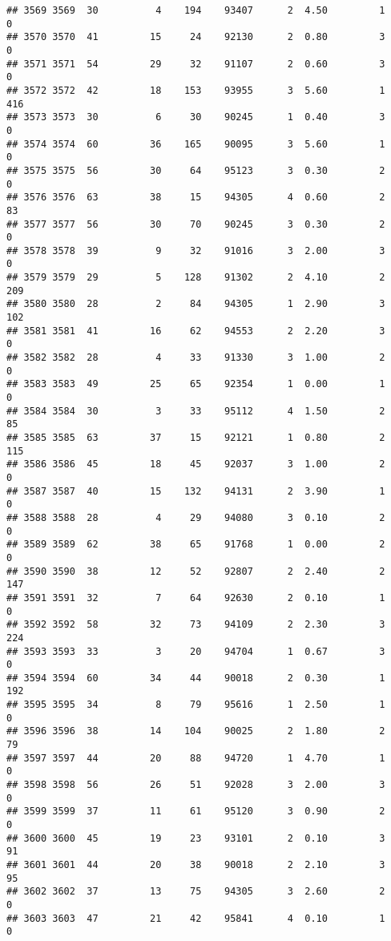 \documentclass[
]{article}
\begin{document}
\begin{verbatim}
## 3569 3569  30          4    194    93407      2  4.50         1        0
## 3570 3570  41         15     24    92130      2  0.80         3        0
## 3571 3571  54         29     32    91107      2  0.60         3        0
## 3572 3572  42         18    153    93955      3  5.60         1      416
## 3573 3573  30          6     30    90245      1  0.40         3        0
## 3574 3574  60         36    165    90095      3  5.60         1        0
## 3575 3575  56         30     64    95123      3  0.30         2        0
## 3576 3576  63         38     15    94305      4  0.60         2       83
## 3577 3577  56         30     70    90245      3  0.30         2        0
## 3578 3578  39          9     32    91016      3  2.00         3        0
## 3579 3579  29          5    128    91302      2  4.10         2      209
## 3580 3580  28          2     84    94305      1  2.90         3      102
## 3581 3581  41         16     62    94553      2  2.20         3        0
## 3582 3582  28          4     33    91330      3  1.00         2        0
## 3583 3583  49         25     65    92354      1  0.00         1        0
## 3584 3584  30          3     33    95112      4  1.50         2       85
## 3585 3585  63         37     15    92121      1  0.80         2      115
## 3586 3586  45         18     45    92037      3  1.00         2        0
## 3587 3587  40         15    132    94131      2  3.90         1        0
## 3588 3588  28          4     29    94080      3  0.10         2        0
## 3589 3589  62         38     65    91768      1  0.00         2        0
## 3590 3590  38         12     52    92807      2  2.40         2      147
## 3591 3591  32          7     64    92630      2  0.10         1        0
## 3592 3592  58         32     73    94109      2  2.30         3      224
## 3593 3593  33          3     20    94704      1  0.67         3        0
## 3594 3594  60         34     44    90018      2  0.30         1      192
## 3595 3595  34          8     79    95616      1  2.50         1        0
## 3596 3596  38         14    104    90025      2  1.80         2       79
## 3597 3597  44         20     88    94720      1  4.70         1        0
## 3598 3598  56         26     51    92028      3  2.00         3        0
## 3599 3599  37         11     61    95120      3  0.90         2        0
## 3600 3600  45         19     23    93101      2  0.10         3       91
## 3601 3601  44         20     38    90018      2  2.10         3       95
## 3602 3602  37         13     75    94305      3  2.60         2        0
## 3603 3603  47         21     42    95841      4  0.10         1        0

\end{verbatim}
\end{document}
